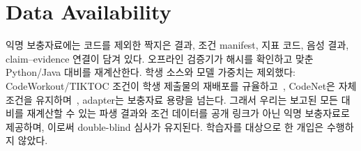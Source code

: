 \documentclass[10pt,conference]{IEEEtran}
\begin{document}
\section*{Data Availability}
익명 보충자료에는 코드를 제외한 짝지은 결과, 조건 manifest, 지표 코드, 음성 결과, claim--evidence 연결이 담겨 있다. 오프라인 검증기가 해시를 확인하고 맞춘 Python/Java 대비를 재계산한다. 학생 소스와 모델 가중치는 제외했다: CodeWorkout/TIKTOC 조건이 학생 제출물의 재배포를 규율하고~\cite{duan2024tiktoc}, CodeNet은 자체 조건을 유지하며~\cite{puri2021project}, adapter는 보충자료 용량을 넘는다. 그래서 우리는 보고된 모든 대비를 재계산할 수 있는 파생 결과와 조건 데이터를 공개 링크가 아닌 익명 보충자료로 제공하며, 이로써 double-blind 심사가 유지된다. 학습자를 대상으로 한 개입은 수행하지 않았다.

\clearpage
{}


\end{document}
